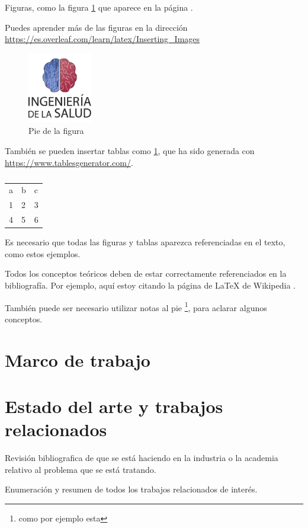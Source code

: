 Figuras, como la figura \ref{fig:escudo} que aparece en la página \pageref{fig:escudo}. 

Puedes aprender más de las figuras en la dirección \url{https://es.overleaf.com/learn/latex/Inserting_Images}

\begin{figure}[h]
    \centering
    \includegraphics[width=0.25\textwidth]{img/escudoSalud.pdf}
    \caption{Pie de la figura}
    \label{fig:escudo}
\end{figure}


También se pueden insertar tablas como \ref{tab:my-table}, que ha sido generada con \url{https://www.tablesgenerator.com/}.

\begin{table}[]
\begin{tabular}{lll}
a & b & c \\
1 & 2 & 3 \\
4 & 5 & 6
\end{tabular}
\caption{}
\label{tab:my-table}
\end{table}

Es necesario que todas las figuras y tablas aparezca referenciadas en el texto, como estos ejemplos.

Todos los conceptos teóricos deben de estar correctamente referenciados en la bibliografía. Por ejemplo, aquí estoy citando la página de \LaTeX{} de Wikipedia \cite{wiki:latex}.

También puede ser necesario utilizar notas al pie \footnote{como por ejemplo esta}, para aclarar algunos conceptos.

\section{Marco de trabajo}

\section{Estado del arte y trabajos relacionados}

Revisión bibliografica de que se está haciendo en la industria o la academia relativo al problema que se está tratando.

Enumeración y resumen de todos los trabajos relacionados de interés.

